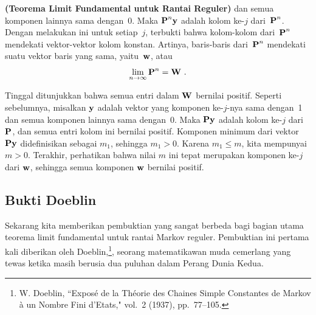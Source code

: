 \begin{theorem}{\bf (Teorema Limit Fundamental untuk Rantai Reguler)}
dan semua komponen lainnya sama dengan~0. Maka ${\mbox{\bf P}\/}^n {\mbox{\bf y}\/}$ adalah
kolom ke-$j$ dari~${\mbox{\bf P}\/}^n$. Dengan melakukan ini untuk setiap~$j$, terbukti
bahwa kolom-kolom dari~${\mbox{\bf P}\/}^n$ mendekati vektor-vektor kolom konstan.
Artinya, baris-baris dari~${\mbox{\bf P}\/}^n$ mendekati suatu vektor baris yang sama,
yaitu~${\mbox{\bf w}\/}$, atau
$$
\lim_{n \to \infty} \mat {P}^n = \mat {W}\ .  \label{eq 11.4.5}
$$
\par
Tinggal ditunjukkan bahwa semua entri dalam ${\mbox{\bf W}\/}$ bernilai positif. Seperti
sebelumnya, misalkan
${\mbox{\bf y}\/}$ adalah vektor yang komponen ke-$j$-nya sama dengan~1 dan semua komponen
lainnya sama dengan~0.
Maka ${\mbox{\bf P}\/}{\mbox{\bf y}\/}$ adalah kolom ke-$j$ dari ${\mbox{\bf P}\/}$, dan semua entri kolom
ini bernilai positif. Komponen minimum dari vektor ${\mbox{\bf P}\/}{\mbox{\bf y}\/}$ didefinisikan
sebagai $m_1$, sehingga
$m_1 > 0$. Karena $m_1 \le m$, kita mempunyai $m > 0$. Terakhir, perhatikan
bahwa nilai $m$ ini tepat merupakan
komponen ke-$j$ dari ${\mbox{\bf w}\/}$, sehingga semua komponen ${\mbox{\bf w}\/}$ bernilai
positif.
\end{theorem}

\subsection*{Bukti Doeblin}
Sekarang kita memberikan pembuktian yang sangat berbeda bagi bagian utama
teorema limit fundamental untuk
rantai Markov reguler. Pembuktian ini pertama kali diberikan oleh
Doeblin,\footnote{W. Doeblin, ``Expos\'e de la Th\'eorie des Chaines Simple Constantes
de Markov \`a un
Nombre Fini d'Etats,"  vol.~2
(1937), pp.~77--105.}, seorang matematikawan muda cemerlang yang tewas
ketika masih berusia dua puluhan dalam Perang Dunia Kedua.

